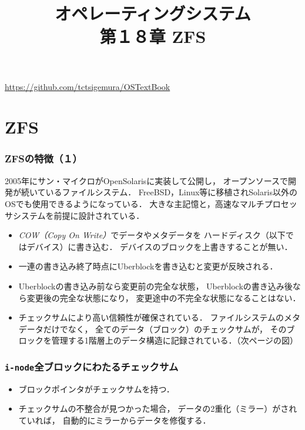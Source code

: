 \documentclass{beamer}                   %
\newcommand{\inode}{\texttt{i-node}}
\begin{document}
\title[ZFS]
      {オペレーティングシステム\\第１８章 ZFS}
\date{}
\begin{frame}
  \titlepage
  \centerline{\url{https://github.com/tctsigemura/OSTextBook}}
\end{frame}


\section{ZFS}
\begin{frame}
  \frametitle{ZFSの特徴（１）}
  2005年にサン・マイクロがOpenSolarisに実装して公開し，
  オープンソースで開発が続いているファイルシステム．
  FreeBSD，Linux等に移植されSolaris以外のOSでも使用できるようになっている．
  大きな主記憶と，高速なマルチプロセッサシステムを前提に設計されている．

  \begin{itemize}
  \item \emph{COW（Copy On Write）}でデータやメタデータを
    ハードディスク（以下ではデバイス）に書き込む．
    デバイスのブロックを上書きすることが無い．
  \item 一連の書き込み終了時点にUberblockを書き込むと変更が反映される．
  \item Uberblockの書き込み前なら変更前の完全な状態，
    Uberblockの書き込み後なら変更後の完全な状態になり，
    変更途中の不完全な状態になることはない．
  \item チェックサムにより高い信頼性が確保されている．
    ファイルシステムのメタデータだけでなく，
    全てのデータ（ブロック）のチェックサムが，
    そのブロックを管理する1階層上のデータ構造に記録されている．（次ページの図）
  \end{itemize}
  \vfill
\end{frame}

\begin{frame}
  \frametitle{\inode 全ブロックにわたるチェックサム}
  \begin{itemize}
    \item ブロックポインタがチェックサムを持つ．
    \item チェックサムの不整合が見つかった場合，
      データの2重化（ミラー）がされていれば，
      自動的にミラーからデータを修復する．
  \end{itemize}
  \vfill
\end{frame}
\end{document}
